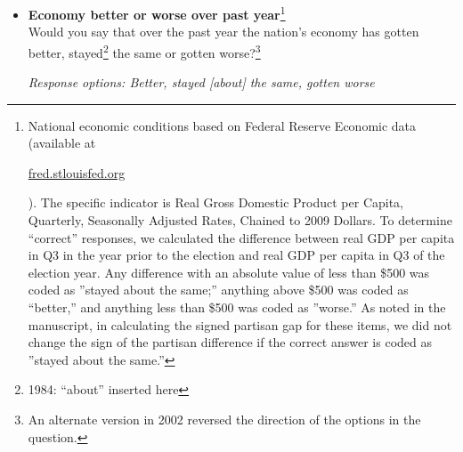 \documentclass[12pt, letterpaper]{article}
\begin{document}
\normalsize
{\begin{itemize}
\item \textbf{Economy better or worse over past year}\footnote{National economic conditions based on Federal Reserve Economic data (available at \begin{footnotesize} \url{fred.stlouisfed.org} \end{footnotesize}). The specific indicator is Real Gross Domestic Product per Capita, Quarterly, Seasonally Adjusted Rates, Chained to 2009 Dollars. To determine ``correct'' responses, we calculated the difference between real GDP per capita in Q3 in the year prior to the election and real GDP per capita in Q3 of the election year. Any difference with an absolute value of less than \$500 was coded as ''stayed about the same;'' anything above \$500 was coded as ``better,'' and anything less than \$500 was coded as ''worse.'' As noted in the manuscript, in calculating the signed partisan gap for these items, we did not change the sign of the partisan difference if the correct answer is coded as ''stayed about the same.''}   \\
Would you say that over the past year the nation's economy has gotten better, stayed\footnote{1984: ``about'' inserted here} the same or gotten worse?\footnote{An alternate version in 2002 reversed the direction of the options in the question.} 

\textit{Response options: Better, stayed [about] the same, gotten worse} \\


\end{itemize}}
\end{document}
